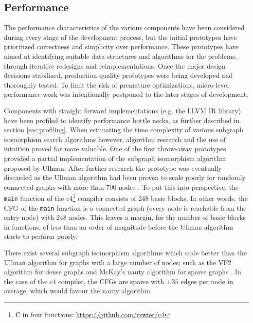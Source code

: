 
\subsection{Performance}

The performance characteristics of the various components have been considered during every stage of the development process, but the initial prototypes have prioritized correctness and simplicity over performance. These prototypes have aimed at identifying suitable data structures and algorithms for the problems, through iterative redesigns and reimplementations. Once the major design decisions stabilized, production quality prototypes were being developed and thoroughly tested. To limit the risk of premature optimizations, micro-level performance work was intentionally postponed to the later stages of development.

Components with straight forward implementations (e.g. the LLVM IR library) have been profiled to identify performance bottle necks, as further described in section \ref{sec:profiling}. When estimating the time complexity of various subgraph isomorphism search algorithms however, algorithm research and the use of intuition proved far more valuable. One of the first throw-away prototypes provided a partial implementation of the subgraph isomorphism algorithm proposed by Ullman. After further research the prototype was eventually discarded as the Ullman algorithm had been proven to scale poorly for randomly connected graphs with more than 700 nodes \cite{iso_performance_comparison}. To put this into perspective, the \texttt{main} function of the c4\footnote{C in four functions: \url{https://github.com/rswier/c4}} compiler consists of 248 basic blocks. In other words, the CFG of the \texttt{main} function is a connected graph (every node is reachable from the entry node) with 248 nodes. This leaves a margin, for the number of basic blocks in functions, of less than an order of magnitude before the Ullman algorithm starts to perform poorly.

There exist several subgraph isomorphism algorithms which scale better than the Ullman algorithm for graphs with a large number of nodes; such as the VF2 algorithm for dense graphs and McKay's nauty algorithm for sparse graphs \cite{iso_performance_comparison,subgraph_isomorphism_algorithms}. In the case of the c4 compiler, the CFGs are sparse with $ 1.35 $ edges per node in average, which would favour the nauty algorithm.

